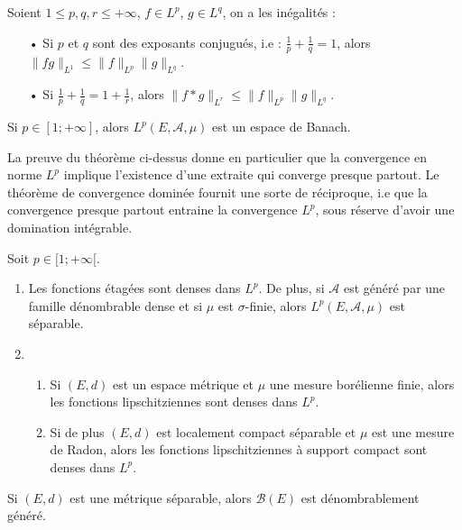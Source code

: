 \documentclass[11pt,a4paper]{article}
\begin{document}
\begin{thmstar}
Soient $ 1 \leq p,q,r \leq +\infty$, $f\in L^p$, $g \in L^q$, on a les inégalités :
\begin{itemize}
\item[•] Si $p$ et $q$ sont des exposants conjugués, i.e : $\frac{1}{p} + \frac{1}{q} = 1$, alors $\|fg\|_{L^1} \leq \|f\|_{L^p}\|g\|_{L^q}$.
\item[•] Si $\frac{1}{p} + \frac{1}{q} = 1 + \frac{1}{r}$, alors $\|f*g\|_{L^r} \leq \|f\|_{L^p}\|g\|_{L^q}$.
\end{itemize}
\end{thmstar}

\begin{thmstar}
Si $p \in [1; +\infty]$, alors $L^p(E,\mathcal{A},\mu)$ est un espace de Banach.
\end{thmstar}


\begin{rmq}
La preuve du théorème ci-dessus donne en particulier que la convergence en norme $L^p$ implique l'existence d'une extraite qui converge presque partout. Le théorème de convergence dominée fournit une sorte de réciproque, i.e que la convergence presque partout entraine la convergence $L^p$, sous réserve d'avoir une domination intégrable.
\end{rmq}

\begin{thmstar}[Densité]
Soit $p \in [1;+\infty[$.
\begin{enumerate}
\item Les fonctions étagées sont denses dans $L^p$. De plus, si $\mathcal{A}$ est généré par une famille dénombrable dense et si $\mu$ est $\sigma$-finie, alors $L^p(E,\mathcal{A}, \mu)$ est séparable.
\item 
\begin{enumerate}
\item Si $(E,d)$ est un espace métrique et $\mu$ une mesure borélienne finie, alors les fonctions lipschitziennes sont denses dans $L^p$.
\item Si de plus $(E,d)$ est localement compact séparable et $\mu$ est une mesure de Radon, alors les fonctions lipschitziennes à support compact sont denses dans $L^p$.
\end{enumerate}
\end{enumerate}
\end{thmstar}

\begin{rmq}
Si  $(E,d)$ est une métrique séparable, alors $\mathcal{B}(E)$ est dénombrablement généré.
\end{rmq}
\end{document}
